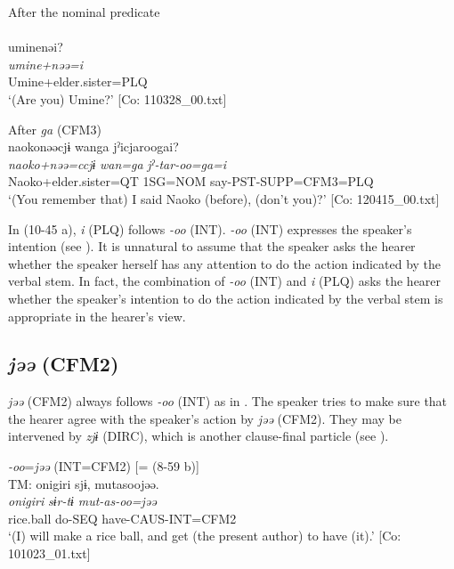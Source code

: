\begin{xlist}
  \ex After the nominal predicate\\\\
      \glll    uminenəi?\\
    \textit{umine+nəə=i}\\
    Umine+elder.sister=PLQ\\
\glt     ‘(Are you) Umine?’  [Co: 110328\_00.txt]

  \ex After \textit{ga} (CFM3)\\
      \glll    naokonəəcjɨ  wanga  jˀicjaroogai?\\
    \textit{naoko+nəə=ccjɨ}  \textit{wan=ga}  \textit{jˀ-tar-oo=ga=i}\\
    Naoko+elder.sister=QT  1SG=NOM  say-PST-SUPP=CFM3=PLQ\\
  \glt     ‘(You remember that) I said Naoko (before), (don’t you)?’  [Co: 120415\_00.txt]
  \z
\z

In (10-45 a), \textit{i} (PLQ) follows \textit{{}-oo} (INT). \textit{{}-oo} (INT) expresses the speaker’s intention (see ). It is unnatural to assume that the speaker asks the hearer whether the speaker herself has any attention to do the action indicated by the verbal stem. In fact, the combination of \textit{{}-oo} (INT) and \textit{i} (PLQ) asks the hearer whether the speaker’s intention to do the action indicated by the verbal stem is appropriate in the hearer’s view.

\subsection{\textit{jəə} (CFM2)}\label{sec:10.3.4}

\textit{jəə} (CFM2) always follows \textit{-oo} (INT) as in . The speaker tries to make sure that the hearer agree with the speaker’s action by \textit{jəə} (CFM2). They may be intervened by \textit{zjɨ} (DIRC), which is another clause-final particle (see ).

\ea\label{ex:10.46}   \textit{{}-oo}=\textit{jəə} (INT=CFM2) [= (8-59 b)]\\
  \ea TM:
      \glll    {\textbar}onigiri{\textbar}  sjɨ,  mutasoojəə.\\
      \textit{onigiri}  \textit{sɨr-tɨ}  \textit{mut-as-oo=jəə}\\
      rice.ball  do-SEQ  have-CAUS-INT=CFM2\\
      \glt       ‘(I) will make a rice ball, and get (the present author) to have (it).’ [Co: 101023\_01.txt]


\end{xlist}
